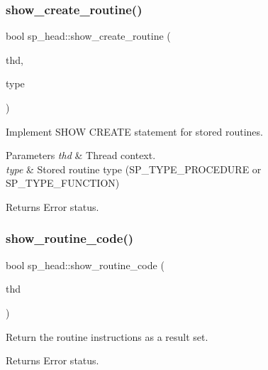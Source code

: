 \subsubsection{\texorpdfstring{show\+\_\+create\+\_\+routine()}{show\_create\_routine()}}
{\footnotesize\ttfamily bool sp\+\_\+head\+::show\+\_\+create\+\_\+routine (\begin{DoxyParamCaption}\item[{T\+HD $\ast$}]{thd,  }\item[{enum\+\_\+sp\+\_\+type}]{type }\end{DoxyParamCaption})}

Implement S\+H\+OW C\+R\+E\+A\+TE statement for stored routines.


\begin{DoxyParams}{Parameters}
{\em thd} & Thread context. \\
\hline
{\em type} & Stored routine type (S\+P\+\_\+\+T\+Y\+P\+E\+\_\+\+P\+R\+O\+C\+E\+D\+U\+RE or S\+P\+\_\+\+T\+Y\+P\+E\+\_\+\+F\+U\+N\+C\+T\+I\+ON)\\
\hline
\end{DoxyParams}
\begin{DoxyReturn}{Returns}
Error status. 
\end{DoxyReturn}
\mbox{\label{classsp__head_a5e21bc35a54f6ae0906389b2af13d93c}} 
\subsubsection{\texorpdfstring{show\+\_\+routine\+\_\+code()}{show\_routine\_code()}}
{\footnotesize\ttfamily bool sp\+\_\+head\+::show\+\_\+routine\+\_\+code (\begin{DoxyParamCaption}\item[{T\+HD $\ast$}]{thd }\end{DoxyParamCaption})}

Return the routine instructions as a result set. \begin{DoxyReturn}{Returns}
Error status. 
\end{DoxyReturn}
\mbox{\label{classsp__head_a1fbc49e61e66bcee9a00621f806beed2}} 
